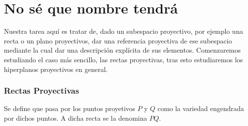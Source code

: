 \chapter{No sé que nombre tendrá}
\label{C3}

Nuestra tarea aquí es tratar de, dado un subespacio proyectivo, por ejemplo una recta o un plano proyectivos, dar una referencia proyectiva de ese subespacio mediante la cual dar una descripción explícita de sus elementos. Comenzaremos estudiando el caso más sencillo, las rectas proyectivas, tras esto estudiaremos los hiperplanos proyectivos en general.

\subsection{Rectas Proyectivas}
\begin{defi}
	\label{C1_def_rectaProyectiva}
	Se define  que pasa por los puntos proyetivos $P$ y $Q$ como la variedad engendrada por dichos puntos. A dicha recta se la denomina  $PQ$.
\end{defi}
